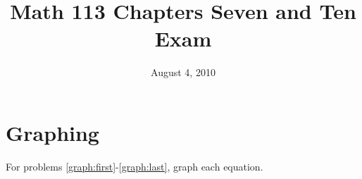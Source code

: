 \documentclass[fleqn,addpoints]{exam}
\title{Math 113 Chapters Seven and Ten Exam}
\author{}
\date{August 4, 2010}
\begin{document}
\maketitle

\ifprintanswers
\else
\vspace{0.2in}
\vspace{0.2in}

\begin{center}
\gradetable[h][pages]
\end{center}

\fi

\section{Graphing}

For problems \ref{graph:first}-\ref{graph:last}, graph each equation.
\end{document}
